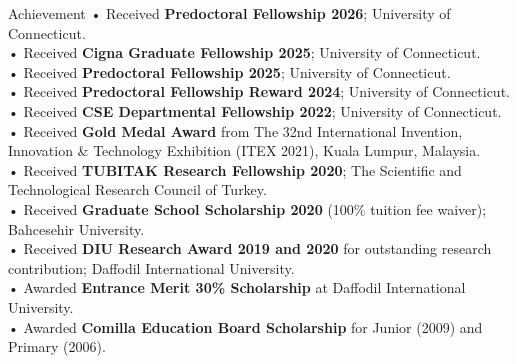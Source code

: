 \begin{rSection}{Achievement}
{• Received \textbf{Predoctoral Fellowship 2026}; University of Connecticut. \\
• Received \textbf{Cigna Graduate Fellowship 2025}; University of Connecticut. \\
• Received \textbf{Predoctoral Fellowship 2025}; University of Connecticut. \\
• Received \textbf{Predoctoral Fellowship Reward 2024}; University of Connecticut. \\
• Received \textbf{CSE Departmental Fellowship 2022}; University of Connecticut. \\
• Received \textbf{Gold Medal Award} from The 32nd International Invention, Innovation \& Technology Exhibition (ITEX 2021), Kuala Lumpur, Malaysia. \\
• Received \textbf{TUBITAK Research Fellowship 2020}; The Scientific and Technological Research Council of Turkey. \\
• Received \textbf{Graduate School Scholarship 2020} (100\% tuition fee waiver); Bahcesehir University. \\
• Received \textbf{DIU Research Award 2019 and 2020} for outstanding research contribution; Daffodil International University.\\
• Awarded \textbf{Entrance Merit 30\% Scholarship} at Daffodil International University. \\
• Awarded \textbf{ Comilla Education Board Scholarship} for Junior (2009) and Primary (2006).} 
\end{rSection}



